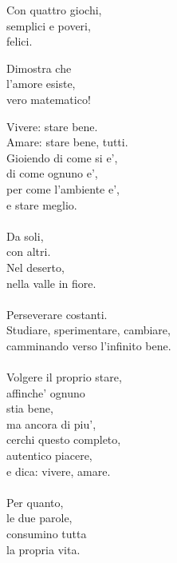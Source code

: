 \begin{haiku}
Con quattro giochi,\\
semplici e poveri,\\
felici.\\
\end{haiku}

\begin{haiku}
    Dimostra che\\
    l'amore esiste,\\
    vero matematico!\\
\end{haiku}

\begin{haiku}
    Vivere: stare bene.\\
    Amare: stare bene, tutti.\\
    Gioiendo di come si e',\\
    di come ognuno e',\\
    per come l'ambiente e',\\
    e stare meglio.\\
    \leavevmode\\
    Da soli,\\
    con altri.\\
    Nel deserto,\\
    nella valle in fiore.\\
    \leavevmode\\
    Perseverare costanti.\\
    Studiare, sperimentare, cambiare,\\
    camminando verso l'infinito bene.\\
    \leavevmode\\
    Volgere il proprio stare,\\
    affinche' ognuno\\
    stia bene,\\
    ma ancora di piu',\\
    cerchi questo completo,\\
    autentico piacere,\\
    e dica: vivere, amare.\\
    \leavevmode\\
    Per quanto,\\
    le due parole,\\
    consumino tutta \\
    la propria vita.\\
\end{haiku}

